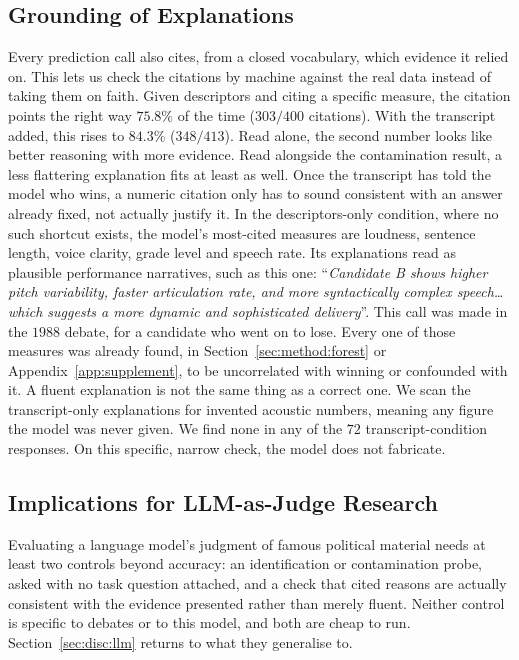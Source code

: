 \documentclass[pdflatex,sn-mathphys-num]{sn-jnl}%
\begin{document}
\subsection{Grounding of Explanations}
\label{sec:llm:grounding}

Every prediction call also cites, from a closed vocabulary, which evidence
it relied on. This lets us check the citations by machine against the real
data instead of taking them on faith. Given descriptors and citing a
specific measure, the citation points the right way $75.8\%$ of the time
($303/400$ citations). With the transcript added, this rises to $84.3\%$
($348/413$). Read alone, the second number looks like better reasoning with
more evidence. Read alongside the contamination result, a less flattering
explanation fits at least as well. Once the transcript has told the model
who wins, a numeric citation only has to sound consistent with an answer
already fixed, not actually justify it. In the descriptors-only condition,
where no such shortcut exists, the model's most-cited measures are
loudness, sentence length, voice clarity, grade level and speech rate. Its
explanations read as plausible performance narratives, such as this one:
``\emph{Candidate B shows higher pitch variability, faster articulation
rate, and more syntactically complex speech\ldots which suggests a more
dynamic and sophisticated delivery}''. This call was made in the $1988$
debate, for a candidate who went on to lose. Every one of those measures
was already found, in Section~\ref{sec:method:forest} or
Appendix~\ref{app:supplement}, to be uncorrelated with winning or confounded
with it. A fluent explanation is not the same thing as a correct one. We
scan the transcript-only explanations for invented acoustic numbers,
meaning any figure the model was never given. We find none in any of the
$72$ transcript-condition responses. On this specific, narrow check, the
model does not fabricate.

\subsection{Implications for LLM-as-Judge Research}
\label{sec:llm:implications}

Evaluating a language model's judgment of famous political material needs
at least two controls beyond accuracy: an identification or contamination
probe, asked with no task question attached, and a check that cited reasons
are actually consistent with the evidence presented rather than merely
fluent. Neither control is specific to debates or to this model, and both
are cheap to run. Section~\ref{sec:disc:llm} returns to what they generalise
to.
\end{document}
